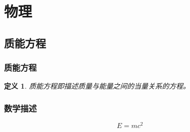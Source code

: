 \documentclass{article}
\newtheorem{definition}{定义}[section]
\begin{document}
    \section{物理}
    \subsection{质能方程} %
    \subsubsection{质能方程}
    \begin{definition}	
        {质能方程}即描述质量与能量之间的当量关系的方程。
    \end{definition}
    \subsubsection{数学描述}  
     \begin{equation} 
        E=mc^2 
     \end{equation}
\end{document}
